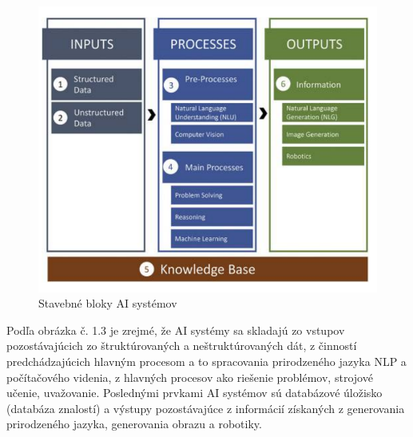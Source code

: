 \begin{figure}[!ht]
    \centering
    \includegraphics[width=1\textwidth]{figures/stavebne-bloky-ai-systemov.png}
    \caption{Stavebné bloky AI systémov}
    \end{figure}

Podľa obrázka č. 1.3 je zrejmé, že AI systémy sa skladajú zo vstupov pozostávajúcich zo štruktúrovaných a neštruktúrovaných dát, z činností predchádzajúcich hlavným procesom a to spracovania prirodzeného jazyka NLP a počítačového videnia, z hlavných procesov ako riešenie problémov, strojové učenie, uvažovanie. Poslednými prvkami AI systémov sú databázové úložisko (databáza znalostí) a výstupy pozostávajúce z informácií získaných z generovania prirodzeného jazyka, generovania obrazu a robotiky. \cite{paschen2020}

